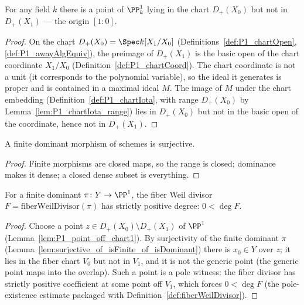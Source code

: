 \begin{lemma}
  \label{lem:P1_point_off_chart1}
  \leanok
  For any field \(k\) there is a point of \(\PP^1_k\) lying in the chart \(D_+(X_0)\) but
  not in \(D_+(X_1)\) — the origin \([1 : 0]\).
\end{lemma}
\begin{proof}
  \leanok
  On the chart \(D_+(X_0) = \Spec k[X_1/X_0]\) (Definitions~\ref{def:P1_chartOpen},
  \ref{def:P1_awayAlgEquiv}), the preimage of \(D_+(X_1)\) is the basic open of the chart
  coordinate \(X_1/X_0\) (Definition~\ref{def:P1_chartCoord}). The chart coordinate is not
  a unit (it corresponds to the polynomial variable), so the ideal it generates is proper
  and is contained in a maximal ideal \(M\). The image of \(M\) under the chart embedding
  (Definition~\ref{def:P1_chartIota}, with range \(D_+(X_0)\) by
  Lemma~\ref{lem:P1_chartIota_range}) lies in \(D_+(X_0)\) but not in the basic open of the
  coordinate, hence not in \(D_+(X_1)\).
\end{proof}

\begin{lemma}
  \label{lem:surjective_of_isFinite_of_isDominant}
  \leanok
  A finite dominant morphism of schemes is surjective.
\end{lemma}
\begin{proof}
  \leanok
  Finite morphisms are closed maps, so the range is closed; dominance makes it dense; a
  closed dense subset is everything.
\end{proof}

\begin{theorem}
  \label{thm:zero_lt_deg_fiberWeilDivisor}
  \leanok
  For a finite dominant \(\pi \colon Y \to \PP^1\), the fiber Weil divisor
  \(F = \mathrm{fiberWeilDivisor}(\pi)\) has strictly positive degree: \(0 < \deg F\).
\end{theorem}
\begin{proof}
  \leanok
  Choose a point \(z \in D_+(X_0) \setminus D_+(X_1)\) of \(\PP^1\)
  (Lemma~\ref{lem:P1_point_off_chart1}). By surjectivity of the finite dominant \(\pi\)
  (Lemma~\ref{lem:surjective_of_isFinite_of_isDominant}) there is \(x_0 \in Y\) over \(z\);
  it lies in the fiber chart \(V_0\) but not in \(V_1\), and it is not the generic point
  (the generic point maps into the overlap). Such a point is a pole witness: the fiber
  divisor has strictly positive coefficient at some point off \(V_1\), which forces
  \(0 < \deg F\) (the pole-existence estimate packaged with
  Definition~\ref{def:fiberWeilDivisor}).
\end{proof}

